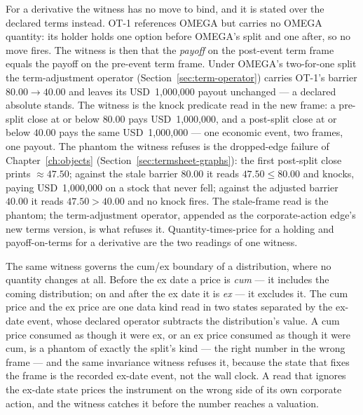 \documentclass[11pt,a4paper]{article}
\newcommand{\USD}[1]{\mbox{USD~#1}}
\begin{document}
For a derivative the witness has no move to bind, and it is stated over the declared terms
instead. OT-1 references OMEGA but carries no OMEGA quantity: its holder holds one option
before OMEGA's split and one after, so no move fires. The witness is then that the
\emph{payoff} on the post-event term frame equals the payoff on the pre-event term frame.
Under OMEGA's two-for-one split the term-adjustment operator (Section~\ref{sec:term-operator})
carries OT-1's barrier $80.00 \rightarrow 40.00$ and leaves its \USD{1{,}000{,}000} payout
unchanged --- a declared absolute stands. The witness is the knock predicate read in the new
frame: a pre-split close at or below $80.00$ pays \USD{1{,}000{,}000}, and a post-split close
at or below $40.00$ pays the same \USD{1{,}000{,}000} --- one economic event, two frames, one
payout. The phantom the witness refuses is the dropped-edge failure of Chapter~\ref{ch:objects}
(Section~\ref{sec:termsheet-graphs}): the first post-split close prints $\approx 47.50$;
against the stale barrier $80.00$ it reads $47.50 \le 80.00$ and knocks, paying
\USD{1{,}000{,}000} on a stock that never fell; against the adjusted barrier $40.00$ it reads
$47.50 > 40.00$ and no knock fires. The stale-frame read is the phantom; the term-adjustment
operator, appended as the corporate-action edge's new terms version, is what refuses it.
Quantity-times-price for a holding and payoff-on-terms for a derivative are the two readings of
one witness.

The same witness governs the cum/ex boundary of a distribution, where no quantity changes
at all. Before the ex date a price is \emph{cum} --- it includes the coming distribution;
on and after the ex date it is \emph{ex} --- it excludes it. The cum price and the ex price
are one data kind read in two states separated by the ex-date event, whose declared
operator subtracts the distribution's value. A cum price consumed as though it were ex, or
an ex price consumed as though it were cum, is a phantom of exactly the split's kind ---
the right number in the wrong frame --- and the same invariance witness refuses it, because
the state that fixes the frame is the recorded ex-date event, not the wall clock. A read
that ignores the ex-date state prices the instrument on the wrong side of its own corporate
action, and the witness catches it before the number reaches a valuation.
\end{document}
